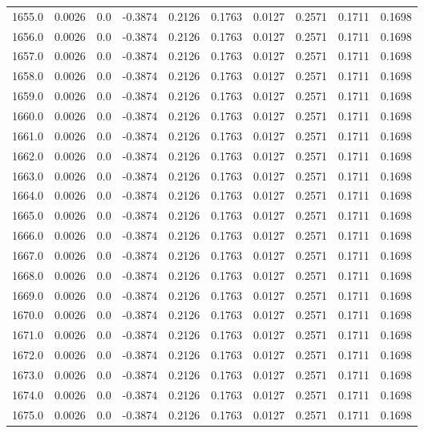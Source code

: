\begin{longtable}{lrrrrrrrrr}
1655.0 & 0.0026 & 0.0 & -0.3874 & 0.2126 & 0.1763 & 0.0127 & 0.2571 & 0.1711 & 0.1698 \\
1656.0 & 0.0026 & 0.0 & -0.3874 & 0.2126 & 0.1763 & 0.0127 & 0.2571 & 0.1711 & 0.1698 \\
1657.0 & 0.0026 & 0.0 & -0.3874 & 0.2126 & 0.1763 & 0.0127 & 0.2571 & 0.1711 & 0.1698 \\
1658.0 & 0.0026 & 0.0 & -0.3874 & 0.2126 & 0.1763 & 0.0127 & 0.2571 & 0.1711 & 0.1698 \\
1659.0 & 0.0026 & 0.0 & -0.3874 & 0.2126 & 0.1763 & 0.0127 & 0.2571 & 0.1711 & 0.1698 \\
1660.0 & 0.0026 & 0.0 & -0.3874 & 0.2126 & 0.1763 & 0.0127 & 0.2571 & 0.1711 & 0.1698 \\
1661.0 & 0.0026 & 0.0 & -0.3874 & 0.2126 & 0.1763 & 0.0127 & 0.2571 & 0.1711 & 0.1698 \\
1662.0 & 0.0026 & 0.0 & -0.3874 & 0.2126 & 0.1763 & 0.0127 & 0.2571 & 0.1711 & 0.1698 \\
1663.0 & 0.0026 & 0.0 & -0.3874 & 0.2126 & 0.1763 & 0.0127 & 0.2571 & 0.1711 & 0.1698 \\
1664.0 & 0.0026 & 0.0 & -0.3874 & 0.2126 & 0.1763 & 0.0127 & 0.2571 & 0.1711 & 0.1698 \\
1665.0 & 0.0026 & 0.0 & -0.3874 & 0.2126 & 0.1763 & 0.0127 & 0.2571 & 0.1711 & 0.1698 \\
1666.0 & 0.0026 & 0.0 & -0.3874 & 0.2126 & 0.1763 & 0.0127 & 0.2571 & 0.1711 & 0.1698 \\
1667.0 & 0.0026 & 0.0 & -0.3874 & 0.2126 & 0.1763 & 0.0127 & 0.2571 & 0.1711 & 0.1698 \\
1668.0 & 0.0026 & 0.0 & -0.3874 & 0.2126 & 0.1763 & 0.0127 & 0.2571 & 0.1711 & 0.1698 \\
1669.0 & 0.0026 & 0.0 & -0.3874 & 0.2126 & 0.1763 & 0.0127 & 0.2571 & 0.1711 & 0.1698 \\
1670.0 & 0.0026 & 0.0 & -0.3874 & 0.2126 & 0.1763 & 0.0127 & 0.2571 & 0.1711 & 0.1698 \\
1671.0 & 0.0026 & 0.0 & -0.3874 & 0.2126 & 0.1763 & 0.0127 & 0.2571 & 0.1711 & 0.1698 \\
1672.0 & 0.0026 & 0.0 & -0.3874 & 0.2126 & 0.1763 & 0.0127 & 0.2571 & 0.1711 & 0.1698 \\
1673.0 & 0.0026 & 0.0 & -0.3874 & 0.2126 & 0.1763 & 0.0127 & 0.2571 & 0.1711 & 0.1698 \\
1674.0 & 0.0026 & 0.0 & -0.3874 & 0.2126 & 0.1763 & 0.0127 & 0.2571 & 0.1711 & 0.1698 \\
1675.0 & 0.0026 & 0.0 & -0.3874 & 0.2126 & 0.1763 & 0.0127 & 0.2571 & 0.1711 & 0.1698 \\

\end{longtable}
